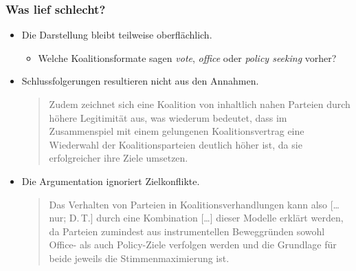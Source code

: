 \documentclass{beamer}
\begin{document}
\begin{frame}
\frametitle{Was lief schlecht?}
\begin{itemize}
  \item Die Darstellung bleibt teilweise oberflächlich.
  \begin{itemize}
    \footnotesize
    \item Welche Koalitionsformate sagen \textit{vote}, \textit{office} oder \textit{policy seeking} vorher?
  \end{itemize}
  \item Schlussfolgerungen resultieren nicht aus den Annahmen.
  \begin{quote}
    \footnotesize
    Zudem zeichnet sich eine Koalition von inhaltlich nahen
    Parteien durch höhere Legitimität aus, was wiederum
    bedeutet, dass im Zusammenspiel mit einem gelungenen
    Koalitionsvertrag eine Wiederwahl der Koalitionsparteien
    deutlich höher ist, da sie erfolgreicher ihre Ziele
    umsetzen.
  \end{quote}
  \item Die Argumentation ignoriert Zielkonflikte.
  \begin{quote}
  \footnotesize
    Das Verhalten von Parteien in Koalitionsverhandlungen kann
    also [\dots nur; D.\,T.]
    durch eine Kombination [\dots] dieser Modelle erklärt
    werden, da Parteien zumindest aus instrumentellen
    Beweggründen sowohl Office- als auch Policy-Ziele
    verfolgen werden und die Grundlage für beide jeweils die
    Stimmenmaximierung ist.
  \end{quote}
\end{itemize}
\end{frame}
\end{document}
